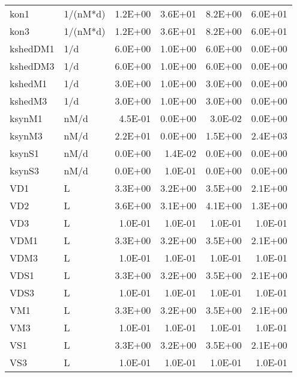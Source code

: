 \begin{tabular}{llrrrr}
  kon1 & 1/(nM*d) & 1.2E+00 & 3.6E+01 & 8.2E+00 & 6.0E+01 \\ 
  kon3 & 1/(nM*d) & 1.2E+00 & 3.6E+01 & 8.2E+00 & 6.0E+01 \\ 
  kshedDM1 & 1/d & 6.0E+00 & 1.0E+00 & 6.0E+00 & 0.0E+00 \\ 
  kshedDM3 & 1/d & 6.0E+00 & 1.0E+00 & 6.0E+00 & 0.0E+00 \\ 
  kshedM1 & 1/d & 3.0E+00 & 1.0E+00 & 3.0E+00 & 0.0E+00 \\ 
  kshedM3 & 1/d & 3.0E+00 & 1.0E+00 & 3.0E+00 & 0.0E+00 \\ 
  ksynM1 & nM/d & 4.5E-01 & 0.0E+00 & 3.0E-02 & 0.0E+00 \\ 
  ksynM3 & nM/d & 2.2E+01 & 0.0E+00 & 1.5E+00 & 2.4E+03 \\ 
  ksynS1 & nM/d & 0.0E+00 & 1.4E-02 & 0.0E+00 & 0.0E+00 \\ 
  ksynS3 & nM/d & 0.0E+00 & 1.0E-01 & 0.0E+00 & 0.0E+00 \\ 
  VD1 & L & 3.3E+00 & 3.2E+00 & 3.5E+00 & 2.1E+00 \\ 
  VD2 & L & 3.6E+00 & 3.1E+00 & 4.1E+00 & 1.3E+00 \\ 
  VD3 & L & 1.0E-01 & 1.0E-01 & 1.0E-01 & 1.0E-01 \\ 
  VDM1 & L & 3.3E+00 & 3.2E+00 & 3.5E+00 & 2.1E+00 \\ 
  VDM3 & L & 1.0E-01 & 1.0E-01 & 1.0E-01 & 1.0E-01 \\ 
  VDS1 & L & 3.3E+00 & 3.2E+00 & 3.5E+00 & 2.1E+00 \\ 
  VDS3 & L & 1.0E-01 & 1.0E-01 & 1.0E-01 & 1.0E-01 \\ 
  VM1 & L & 3.3E+00 & 3.2E+00 & 3.5E+00 & 2.1E+00 \\ 
  VM3 & L & 1.0E-01 & 1.0E-01 & 1.0E-01 & 1.0E-01 \\ 
  VS1 & L & 3.3E+00 & 3.2E+00 & 3.5E+00 & 2.1E+00 \\ 
  VS3 & L & 1.0E-01 & 1.0E-01 & 1.0E-01 & 1.0E-01 \\ 
   \hline
\end{tabular}

